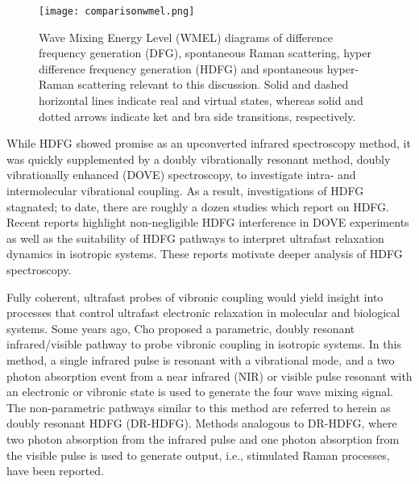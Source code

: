 \documentclass[aip, jcp, reprint, onecolumn]{revtex4-2}
\begin{document}
\begin{figure}[!htbp]
	\centering
	\texttt{[image: comparisonwmel.png]}
	\caption{Wave Mixing Energy Level (WMEL) diagrams of difference frequency generation (DFG), spontaneous Raman scattering, hyper difference frequency generation (HDFG) and spontaneous hyper-Raman scattering relevant to this discussion. \cite{RN286}
	Solid and dashed horizontal lines indicate real and virtual states, whereas solid and dotted arrows indicate ket and bra side transitions, respectively. 
	}
	\label{fig:comparisonwmel}
\end{figure}

While HDFG showed promise as an upconverted infrared spectroscopy method, it was quickly supplemented by a doubly vibrationally resonant method, doubly vibrationally enhanced (DOVE) spectroscopy, to investigate intra- and intermolecular vibrational coupling. \cite{RN345, RN101, Cho2000}
As a result, investigations of HDFG stagnated; to date, there are roughly a dozen studies which report on HDFG. \cite{Zilian1994, RN350, RN416, RN351, RN352, RN353, Chen1998, RN362, RN418, Bonn2024, McDonnell2024}
Recent reports highlight non-negligible HDFG interference in DOVE experiments as well as the suitability of HDFG pathways to interpret ultrafast relaxation dynamics in isotropic systems. \cite{Bonn2024, McDonnell2024}
These reports motivate deeper analysis of HDFG spectroscopy. 

Fully coherent, ultrafast probes of vibronic coupling would yield insight into processes that control ultrafast electronic relaxation in molecular and biological systems. \cite{Bredenbeck2015, Arsenault2021}
Some years ago, Cho proposed a parametric, doubly resonant infrared/visible pathway to probe vibronic coupling in isotropic systems. \cite{Cho2001}
In this method, a single infrared pulse is resonant with a vibrational mode, and a two photon absorption event from a near infrared (NIR) or visible pulse resonant with an electronic or vibronic state is used to generate the four wave mixing signal.
The non-parametric pathways similar to this method are referred to herein as doubly resonant HDFG (DR-HDFG).
Methods analogous to DR-HDFG, where two photon absorption from the infrared pulse and one photon absorption from the visible pulse is used to generate output, i.e., stimulated Raman processes, have been reported. \cite{RN301, RN120} 
\end{document}
